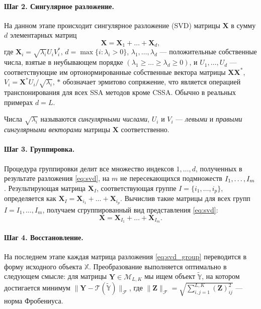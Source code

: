 \documentclass[specialist,
               substylefile = spbu.rtx,
               subf,href,colorlinks=true, 12pt]{disser}
\begin{document}
\paragraph{Шаг 2. Сингулярное разложение.}  
На данном этапе происходит сингулярное разложение (SVD) матрицы $\mathbf{X}$ в сумму $d$ элементарных матриц
\begin{equation} \label{eq:svd}
    \mathbf{X}=\mathbf{X}_1+\ldots+\mathbf{X}_d,
\end{equation}
где
$\mathbf{X}_i=\sqrt{\lambda_i}U_i V_i^\mathrm{*}$, $d=\max\{i : \lambda_i > 0\}$,
$\lambda_1,\ldots,\lambda_d$ --- положительные собственные числа, взятые в неубывающем порядке $(\lambda_1\geqslant\ldots\geqslant\lambda_d\geqslant 0)$, и $U_1,\ldots,U_d$ --- соответствующие им ортонормированные собственные вектора матрицы  $\mathbf{X}\mathbf{X}^\mathrm{*}$, $V_i=\mathbf{X}^\mathrm{*} U_i/\sqrt{\lambda_i}$, $\mathrm{*}$ обозначает эрмитово сопряжение, что является операцией транспонирования для всех SSA методов кроме CSSA. 
Обычно в реальных примерах $d=L$.

Числа $\sqrt{\lambda_i}$ называются \emph{сингулярными числами}, $U_i$  и $V_i$ --- \emph{левыми} и \emph{правыми сингулярными векторами} матрицы  $\mathbf{X}$ соответственно.

\paragraph{Шаг 3. Группировка.}  Процедура группировки делит все множество индексов ${1,\ldots,d}$, полученных в результате разложения \eqref{eq:svd}, на $m$ не пересекающихся подмножеств $I_1,\ldots,\\ I_m$. 
Результирующая матрица $\mathbf{X}_I$, соответствующая группе $I=\{i_1,\ldots,i_p\}$, определяется как $\mathbf{X}_I=\mathbf{X}_{i_1}+\ldots+\mathbf{X}_{i_p}$.
Вычислив такие матрицы для всех групп $I=I_1,\ldots,I_m$, получаем сгруппированный вид представления \eqref{eq:svd}:
\begin{equation}\label{eq:svd_group}
    \mathbf{X}=\mathbf{X}_{I_1}+\ldots+\mathbf{X}_{I_m}.
\end{equation}

\paragraph{Шаг 4. Восстановление.}
На последнем этапе каждая матрица разложения \eqref{eq:svd_group} переводится в форму исходного объекта $\mathbb{X}$. Преобразование выполняется оптимально в следующем смысле: для матрицы $\mathbf{Y} \in \mathcal{M}_{L,K}$ мы ищем объект $\widetilde{\mathbb{Y}}$, на котором достигается минимум $\|\mathbf{Y} -  \mathcal{T}(\widetilde{\mathbb{Y}})\|_{\mathcal{F}}$, где $\|\mathbf{Z}\|_{\mathcal{F}} = \sqrt{\sum_{i,j=1}^{L,K}(\mathbf{Z})_{ij}^2}$ --- норма Фробениуса.
\end{document}
